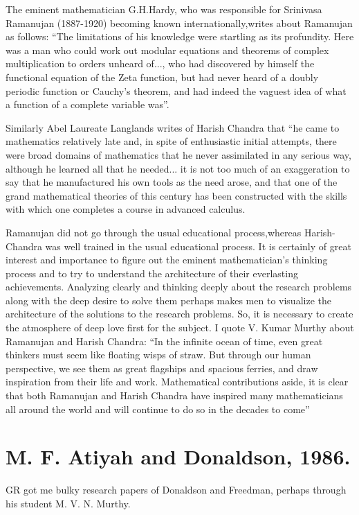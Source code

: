 The eminent mathematician G.H.Hardy, who was responsible for Srinivasa Ramanujan (1887-1920) becoming known internationally,\break writes about Ramanujan as follows: “The limitations of his knowledge were startling as its profundity. Here was a man who could work out modular equations and theorems of complex   multiplication to orders unheard of..., who had discovered by himself the functional equation of the Zeta function, but had never heard of a doubly periodic function or Cauchy’s theorem,  and had indeed the vaguest idea of what a function of a complete variable was”.
 
Similarly Abel Laureate Langlands \cite{chap17-key06RPL} writes of Harish Chandra that “he came to mathematics relatively late and, in spite of enthusiastic initial attempts, there were broad domains of mathematics that he never assimilated in any serious way, although he learned all that he needed... it is not too much of an exaggeration to say that he manufactured his own tools as the need arose, and that one of the grand mathematical theories of this century has been constructed with the skills with which one completes a course in advanced calculus.
 
Ramanujan did not go through the usual educational process,\break whereas Harish-Chandra was well trained in the usual educational process.  It is certainly of great interest and importance to figure out the eminent mathematician’s thinking process and to try to understand the architecture of their everlasting achievements. Analyzing clearly and thinking deeply about the research problems along with the deep desire to solve them perhaps makes men to visualize the architecture of the solutions to the research problems. So, it is necessary to create the atmosphere of deep love first for the subject.  I quote V. Kumar Murthy about Ramanujan and Harish Chandra: “In the infinite ocean of time, even great thinkers must seem like floating wisps of straw. But through our human perspective, we see them as great flagships and spacious ferries, and draw inspiration from their life and work. Mathematical contributions aside, it is clear that both Ramanujan and Harish Chandra have inspired many mathematicians all around the world and will continue to do so in the decades to come”
 
\section*{M. F. Atiyah and Donaldson, 1986.}

GR got me bulky research papers of Donaldson and Freedman, perhaps through his student M. V. N. Murthy.
  
